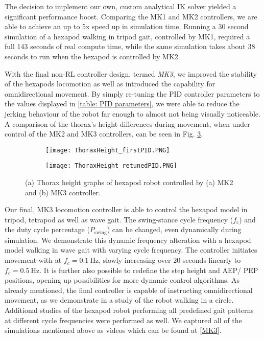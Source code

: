 The decision to implement our own, custom analytical IK solver yielded a significant performance boost.
Comparing the MK1 and MK2 controllers, we are able to achieve an up to 5x speed up in simulation time.
Running a 30 second simulation of a hexapod walking in tripod gait, controlled by MK1, required a full 143 seconds of real compute time, while the same simulation takes about 38 seconds to run when the hexapod is controlled by MK2.

With the final non-RL controller design, termed \textit{MK3}, we improved the stability of the hexapods locomotion as well as introduced the capability for omnidirectional movement.
By simply re-tuning the PID controller parameters to the values displayed in \ref{table: PID parameters}, we were able to reduce the jerking behaviour of the robot far enough to almost not being visually noticeable.
A comparison of the thorax's height differences during movement, when under control of the MK2 and MK3 controllers, can be seen in Fig. \ref{figure: Thorax height graphs}.


\begin{figure}[h]
	\begin{subfigure}{\textwidth} %
		\centering
		\texttt{[image: ThoraxHeight\_firstPID.PNG]}  %
		\caption{}
		\label{figure: Thorax Height graph, bad tuning}
	\end{subfigure}
	
	\begin{subfigure}{\textwidth}
		\centering
		\texttt{[image: ThoraxHeight\_retunedPID.PNG]}   %
		\caption{}
		\label{figure: Thorax height graph, re-tuning}
	\end{subfigure}
	\caption[Thorax height graphs]{(a) Thorax height graphs of hexapod robot controlled by (a) MK2 and (b) MK3 controller.}
	\label{figure: Thorax height graphs}
\end{figure}

Our final, MK3 locomotion controller is able to control the hexapod model in tripod, tetrapod as well as wave gait.
The swing-stance cycle frequency ($f_c$) and the duty cycle percentage ($P_\text{swing}$) can be changed, even dynamically during simulation.
We demonstrate this dynamic frequency alteration with a hexapod model walking in wave gait with varying cycle frequency.
The controller initiates movement with at $f_c = 0.1\ \text{Hz}$, slowly increasing over 20 seconds linearly to $f_c = 0.5\ \text{Hz}$. 
It is further also possible to redefine the step height and AEP/ PEP positions, opening up possibilities for more dynamic control algorithms.
As already mentioned, the final controller is capable of instructing omnidirectional movement, as we demonstrate in a study of the robot walking in a circle.
Additional studies of the hexapod robot performing all predefined gait patterns at different cycle frequencies were performed as well.
We captured all of the simulations mentioned above as videos which can be found at [\hyperref[vid: MK1]{MK3}].


